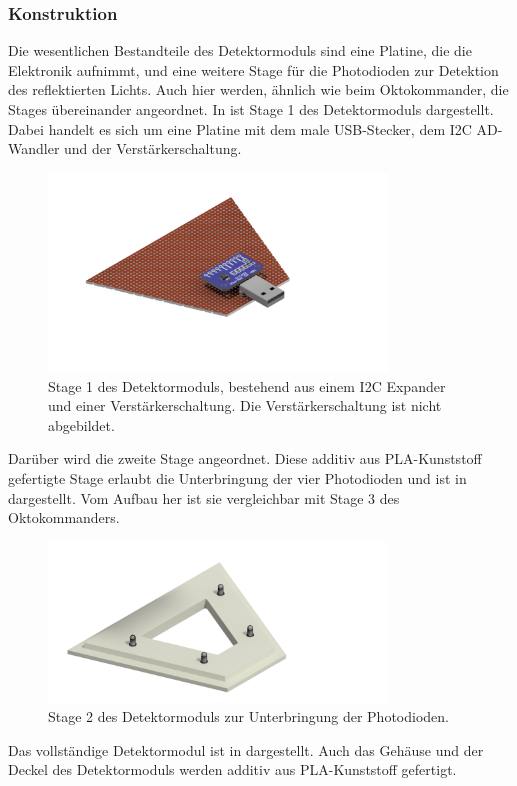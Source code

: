 \subsubsection*{Konstruktion}
Die wesentlichen Bestandteile des Detektormoduls sind eine Platine, die die Elektronik aufnimmt, und eine weitere Stage für die Photodioden zur Detektion des reflektierten Lichts. Auch hier werden, ähnlich wie beim Oktokommander, die Stages übereinander angeordnet. In  ist Stage 1 des Detektormoduls dargestellt. Dabei handelt es sich um eine Platine mit dem male USB-Stecker, dem I2C AD-Wandler und der Verstärkerschaltung.
\begin{figure}[H]
	\centering
	\includegraphics[width=9cm]{../CAD_Bilder/DetektorElektronik_Stage1_raytraced.png}
	\caption{Stage 1 des Detektormoduls, bestehend aus einem I2C Expander und einer Verstärkerschaltung. Die Verstärkerschaltung ist nicht abgebildet.}
	\label{fig:DetektorStage1}
\end{figure}
\noindent
Darüber wird die zweite Stage angeordnet. Diese additiv aus PLA-Kunststoff gefertigte Stage erlaubt die Unterbringung der vier Photodioden und ist in  dargestellt. Vom Aufbau her ist sie vergleichbar mit Stage 3 des Oktokommanders.
\begin{figure}[H]
	\centering
	\includegraphics[width=9cm]{../CAD_Bilder/Detektormodul_Stage2_raytraced.png}
	\caption{Stage 2 des Detektormoduls zur Unterbringung der Photodioden.}
	\label{fig:DetektorStage2}
\end{figure}
\noindent
Das vollständige Detektormodul ist in  dargestellt. Auch das Gehäuse und der Deckel des Detektormoduls werden additiv aus PLA-Kunststoff gefertigt.
